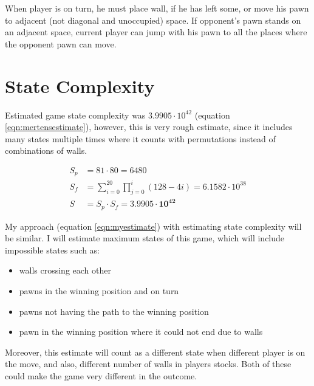 When player is on turn, he must place wall, if he has left some, or move
his pawn to adjacent (not diagonal and unoccupied) space.
If opponent's pawn stands on an adjacent space, current player can jump
with his pawn to all the places where the opponent pawn can move.

\section{State Complexity}
Estimated game state complexity was $3.9905\cdot10^{42}$
\cite{mertens} (equation \ref{eqn:mertensestimate}), however, this is very rough estimate, since
it includes many states multiple times where it counts with permutations
instead of combinations of walls.

\begin{center}
  \vspace*{-1.30cm}
  \begin{equation}
    \label{eqn:mertensestimate}
    \begin{aligned}
      S_p\!&=\!81 \cdot 80 = 6480 \\
      S_f\!&=\!\sum_{i=0}^{20}\prod_{j=0}^{i}(128 - 4i)\!=\!6.1582{\cdot}10^{38} \\
      S\!&=\!S_p \cdot S_f = \mathbf{3.9905 \cdot 10 ^{42}}
    \end{aligned}
  \end{equation}
  \vspace*{-1.15cm}
\end{center}

My approach (equation \ref{eqn:myestimate}) with estimating state complexity
will be similar. I will estimate maximum states of this game, which will
include impossible states such as:
\begin{itemize}
  \vspace*{-0.25cm}
  \setlength\itemsep{0cm}
  \item walls crossing each other
  \item pawns in the winning position and on turn
  \item pawns not having the path to the winning position
  \item pawn in the winning position where it could not end due to walls
  \vspace*{-0.15cm}
\end{itemize}
Moreover, this estimate will count as a different state when different
player is on the move, and also, different number of walls in players
stocks. Both of these could make the game very different in the outcome.

